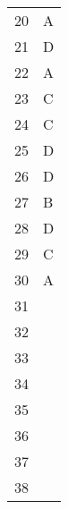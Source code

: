 \documentclass[10pt,twoside]{article}
\begin{document}
\begin{multicols}{2}
\begin{center}
\begin{tabularx}{0.6\columnwidth}{p{1cm}X}
20 & A \\ 
21 & D \\ 
22 & A \\ 
23 & C \\ 
24 & C \\ 
25 & D \\ 
26 & D \\ 
27 & B \\ 
28 & D \\ 
29 & C \\ 
30 & A \\ 
\midrule 
31 &  \\ 
32 &  \\ 
33 &  \\ 
34 &  \\ 
35 &  \\ 
36 &  \\ 
37 &  \\ 
38 &  \\ 
\bottomrule 
\end{tabularx} 
\end{center} 
\end{multicols} 
\end{document}
